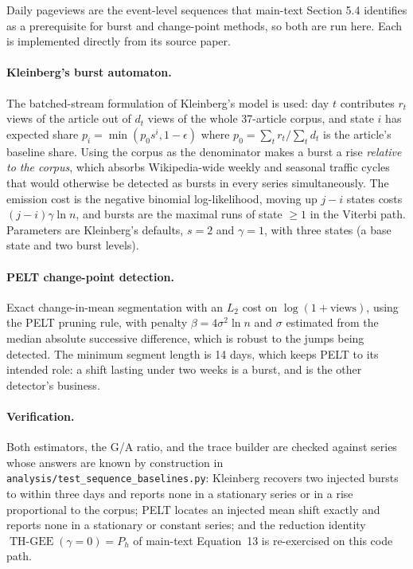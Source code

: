 \documentclass[11pt]{article}
\newcommand{\THGEE}{\operatorname{TH\mbox{-}GEE}}
\begin{document}
Daily pageviews are the event-level sequences that main-text Section 5.4
identifies as a prerequisite for burst and change-point methods, so both are run
here. Each is implemented directly from its source paper.

\paragraph{Kleinberg's burst automaton.}
The batched-stream formulation of Kleinberg's model is used: day $t$ contributes
$r_t$ views of the article out of $d_t$ views of the whole 37-article corpus, and
state $i$ has expected share $p_i = \min(p_0 s^i, 1-\epsilon)$ where
$p_0 = \sum_t r_t / \sum_t d_t$ is the article's baseline share. Using the corpus
as the denominator makes a burst a rise \emph{relative to the corpus}, which
absorbs Wikipedia-wide weekly and seasonal traffic cycles that would otherwise be
detected as bursts in every series simultaneously. The emission cost is the
negative binomial log-likelihood, moving up $j-i$ states costs
$(j-i)\gamma \ln n$, and bursts are the maximal runs of state $\geq 1$ in the
Viterbi path. Parameters are Kleinberg's defaults, $s = 2$ and $\gamma = 1$, with
three states (a base state and two burst levels).

\paragraph{PELT change-point detection.}
Exact change-in-mean segmentation with an $L_2$ cost on $\log(1+\text{views})$,
using the PELT pruning rule, with penalty
$\beta = 4\sigma^2 \ln n$ and $\sigma$ estimated from the median absolute
successive difference, which is robust to the jumps being detected. The minimum
segment length is 14 days, which keeps PELT to its intended role: a shift lasting
under two weeks is a burst, and is the other detector's business.

\paragraph{Verification.}
Both estimators, the G/A ratio, and the trace builder are checked against series
whose answers are known by construction in
\texttt{analysis/test\_sequence\_baselines.py}: Kleinberg recovers two injected
bursts to within three days and reports none in a stationary series or in a rise
proportional to the corpus; PELT locates an injected mean shift exactly and
reports none in a stationary or constant series; and the reduction identity
$\THGEE(\gamma{=}0) = P_h$ of main-text Equation~13 is re-exercised on this code
path.
\end{document}
